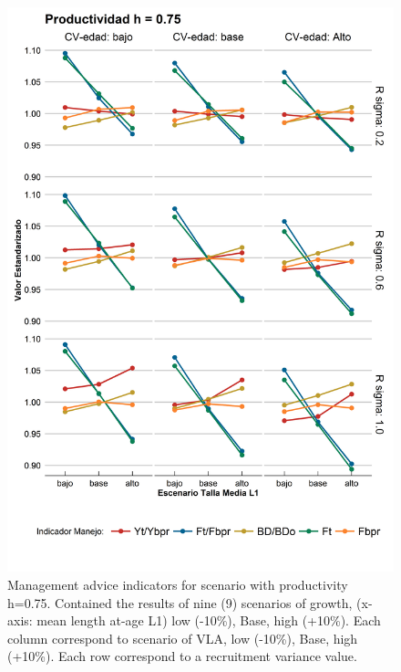 \documentclass[11pt,letterpaper,]{article}
\begin{document}
\begin{figure}[hbtp]
	\begin{center}
\includegraphics[width=0.70\columnwidth]{figures/steepness-75-var.png}
  \end{center}
\caption{Management advice indicators for scenario with productivity h=0.75. Contained the results of nine (9) scenarios of growth, (x-axis: mean length at-age L1) low (-10\%), Base, high (+10\%). Each column correspond to scenario of VLA, low (-10\%), Base, high (+10\%). Each row correspond to a recruitment variance value.}
\label{figure1}
\end{figure}
\end{document}
